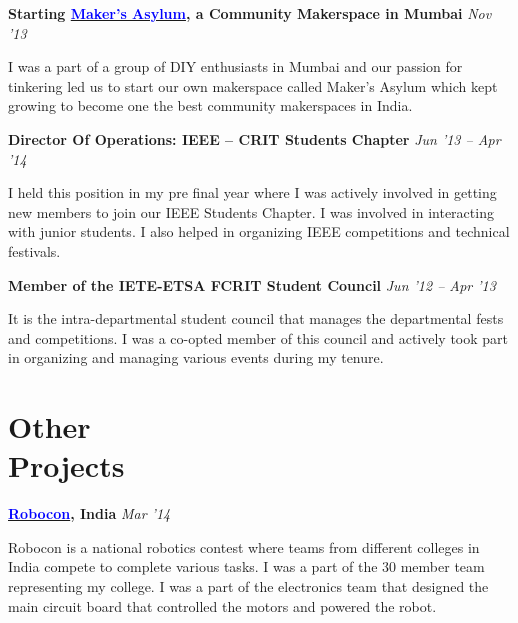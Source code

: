 \documentclass[margin,line]{res}
\newenvironment{list1}{
  \begin{list}{\ding{113}}{%
      \setlength{\itemsep}{0in}
      \setlength{\parsep}{0in} \setlength{\parskip}{0in}
      \setlength{\topsep}{0in} \setlength{\partopsep}{0in}
      \setlength{\leftmargin}{0.17in}}}{\end{list}}
\begin{document}
\begin{resume}
{\bf Starting \href{http://makersasylum.com}{\textcolor{blue} {Maker's Asylum}}, a Community Makerspace in Mumbai} \hfill {\textit{Nov  '13}} \\
\vspace*{-.13in}
\begin{list1}
\item[]
I was a part of a group of DIY enthusiasts in Mumbai and our passion for tinkering led us to start our own makerspace called Maker's Asylum which kept growing to become one the best community makerspaces in India.
\end{list1}

{\bf Director Of Operations: IEEE -- CRIT Students Chapter } \hfill {\textit{Jun '13 -- Apr '14}} \\
\vspace*{-.13in}
\begin{list1}
\item[]
I held this position in my pre final year where I was actively involved in getting new members to join our IEEE Students Chapter. I was involved in interacting with junior students. I also helped in organizing IEEE competitions and technical festivals.
\end{list1}

{\bf Member of the IETE-ETSA FCRIT Student Council} \hfill {\textit{Jun '12 -- Apr '13}} \\
\vspace*{-.13in}
\begin{list1}
\item[]
It is the intra-departmental student council that manages the departmental fests and competitions. I was a co-opted member of this council and actively took part in organizing and managing various events during my tenure.
\end{list1}

\section{\sc Other \\Projects}
{\bf \href{http://www.roboconindia.com}{\textcolor{blue} {Robocon}}, India} \hfill {\textit{Mar '14}} \\
\vspace*{-.15in}
\begin{list1}
\item[]
Robocon is a national robotics contest where teams from different colleges in India compete to complete various tasks. I was a part of the 30 member team representing my college. I was a part of the electronics team that designed the main circuit board that controlled the motors and powered the robot.
\end{list1}


\end{resume}
\end{document}
